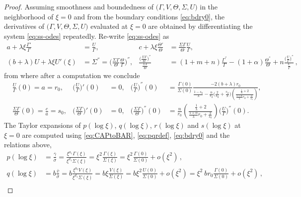 \documentclass[usletter,11pt]{article}
\def\bg{{\bar{\gamma}}}
\def\bv{{\bar{v}}}
\def\bs{{\bar{\sigma}}}
\theoremstyle{remark}
\begin{document}
\begin{proof}
Assuming smoothness and boundedness of $\big(\Gamma,V,\Theta,\Sigma,U\big)$ in the neighborhood of $\xi=0$ and from the boundary conditions \eqref{eq:bdry0}, the derivatives of $\big(\Gamma,V,\Theta,\Sigma,U\big)$ evaluated at $\xi=0$ are obtained by differentiating the system \eqref{eq:ss-odes} repeatedly.
Re-write \eqref{eq:ss-odes} as
\begin{align*}
  a + \lambda\xi\frac{\Gamma'}{\Gamma} &= \frac{U}{\Gamma}, &
  c + \lambda\xi\frac{\Theta'}{\Theta} &= \frac{\Sigma\Gamma}{\Theta} \frac{U}{\Gamma},\\
  (b+\lambda)U  + \lambda \xi U'(\xi) &= \Sigma^{''} = \Big(\frac{\Sigma\Gamma}{\Theta} \frac{\Theta}{\Gamma}\Big)^{''}, &
  \frac{\Big(\frac{\Sigma\Gamma}{\Theta}\Big)^{''}}{\frac{\Sigma\Gamma}{\Theta}} &= (1+m+n)\frac{\Gamma^{''}}{\Gamma}-(1+\alpha) \frac{\Theta^{''}}{\Theta} + n \frac{ \big(\frac{U}{\Gamma}\big)^{''}}{\frac{U}{\Gamma}} \, ,
\end{align*}
from where after a computation we conclude
\begin{align*}
&\frac{U}{\Gamma}(0) = a = r_0,  & \Big(\frac{U}{\Gamma}\Big)'(0)&=0, & \Big(\frac{U}{\Gamma}\Big)^{''}(0) &= \frac{\Gamma(0)}{\Sigma(0)} \frac{-2(b+\lambda)r_0}{\frac{1-s_0}{\lambda}-\frac{n}{r_0}\Big(\frac{2}{s_0} + \frac{r_0}{\lambda}\Big)\left(\frac{ \frac{1}{\lambda}+2}{ \frac{1+\alpha}{\lambda}r_0 + \frac{2}{s_0}}\right)},\\
&\frac{\Sigma\Gamma}{\Theta}(0) = \frac{c}{a} = s_0,  & \Big(\frac{\Sigma\Gamma}{\Theta}\Big)'(0)&=0, &
\Big(\frac{\Sigma\Gamma}{\Theta}\Big)^{''}(0) &= \frac{n}{r_0} \left(\frac{ \frac{1}{\lambda}+2 }{ \frac{1+\alpha}{\lambda}r_0 + \frac{2}{s_0}}\right)\Big(\frac{U}{\Gamma}\Big)^{''}(0).
\end{align*}
The Taylor expansions of $p(\log\xi)$, $q(\log\xi)$, $r(\log\xi)$ and $s(\log\xi)$ at $\xi=0$ are computed using \eqref{eq:CAPtoBAR}, \eqref{eq:pqrdef}, \eqref{eq:bdry0}
and the relations above,
\begin{align*}
 p(\log\xi) &= \frac{ \bg }{\bs}  = \frac{ \xi^{a_1} \Gamma(\xi)}{\xi^{d_1} \Sigma(\xi)} = \xi^2\frac{\Gamma(\xi)}{\Sigma(\xi)} = \xi^2\frac{\Gamma(0)}{\Sigma(0)} + o(\xi^2) \, , \\
 q(\log\xi) &= b\frac{\bv}{\bs} = b\frac{ \xi^{b_1} V(\xi) }{ \xi^{d_1} \Sigma(\xi)} = b\xi\frac{ V(\xi) }{ \Sigma(\xi)} = b\xi^2 \frac{U(0)}{\Sigma(0)}+ o(\xi^2)=\xi^2 ~br_0\frac{\Gamma(0)}{\Sigma(0)} + o(\xi^2) \, ,\\

\end{align*}
\end{proof}
\end{document}
